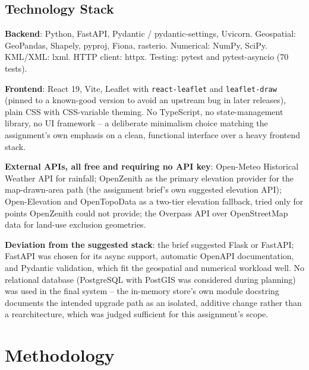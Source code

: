 \documentclass[manuscript,screen]{acmart}
\begin{document}
\subsection{Technology Stack}

\textbf{Backend}: Python, FastAPI, Pydantic / pydantic-settings, Uvicorn.
Geospatial: GeoPandas, Shapely, pyproj, Fiona, rasterio. Numerical: NumPy,
SciPy. KML/XML: lxml. HTTP client: httpx. Testing: pytest and
pytest-asyncio (70 tests).

\textbf{Frontend}: React 19, Vite, Leaflet with \texttt{react-leaflet} and
\texttt{leaflet-draw} (pinned to a known-good version to avoid an upstream
bug in later releases), plain CSS with CSS-variable theming. No
TypeScript, no state-management library, no UI framework -- a deliberate
minimalism choice matching the assignment's own emphasis on a clean,
functional interface over a heavy frontend stack.

\textbf{External APIs, all free and requiring no API key}: Open-Meteo
Historical Weather API for rainfall; OpenZenith as the primary elevation
provider for the map-drawn-area path (the assignment brief's own suggested
elevation API); Open-Elevation and OpenTopoData as a two-tier elevation
fallback, tried only for points OpenZenith could not provide; the
Overpass API over OpenStreetMap data for land-use exclusion geometries.

\textbf{Deviation from the suggested stack}: the brief suggested Flask or
FastAPI; FastAPI was chosen for its async support, automatic OpenAPI
documentation, and Pydantic validation, which fit the geospatial and
numerical workload well. No relational database (PostgreSQL with PostGIS
was considered during planning) was used in the final system -- the
in-memory store's own module docstring documents the intended upgrade
path as an isolated, additive change rather than a rearchitecture, which
was judged sufficient for this assignment's scope.

\section{Methodology}
\label{sec:methodology}
\end{document}
